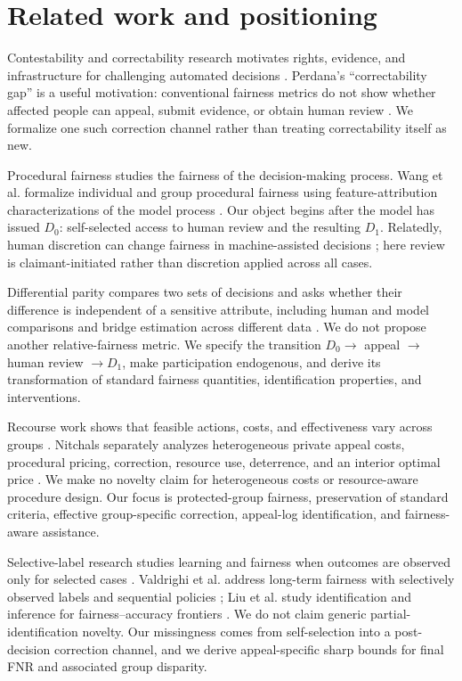 \documentclass[manuscript,screen,review]{jair}
\begin{document}
\section{Related work and positioning}

Contestability and correctability research motivates rights, evidence, and
infrastructure for challenging automated decisions
\citep{kaminski2021,cobbe2021,lyons2021,lyons2022,freiesleben2026}.  Perdana's
``correctability gap'' is a useful motivation: conventional fairness metrics
do not show whether affected people can appeal, submit evidence, or obtain
human review \citep{perdana2026legitimacy}.  We formalize one such correction
channel rather than treating correctability itself as new.

Procedural fairness studies the fairness of the decision-making process.
Wang et al. formalize individual and group procedural fairness using
feature-attribution characterizations of the model process
\citep{wang2026procedural}.  Our object begins after the model has issued
$D_0$: self-selected access to human review and the resulting $D_1$.
Relatedly, human discretion can change fairness in machine-assisted decisions
\citep{gillis2022,angelova2023}; here review is claimant-initiated rather than
discretion applied across all cases.

Differential parity compares two sets of decisions and asks whether their
difference is independent of a sensitive attribute, including human and model
comparisons and bridge estimation across different data
\citep{yu2026differential}.  We do not propose another relative-fairness
metric.  We specify the transition $D_0\to$ appeal $\to$ human review
$\to D_1$, make participation endogenous, and derive its transformation of
standard fairness quantities, identification properties, and interventions.

Recourse work shows that feasible actions, costs, and effectiveness vary
across groups \citep{vonkugelgen2020,kavouras2023}.  Nitchals separately
analyzes heterogeneous private appeal costs, procedural pricing, correction,
resource use, deterrence, and an interior optimal price
\citep{nitchals2026pricing}.  We make no novelty claim for heterogeneous costs
or resource-aware procedure design.  Our focus is protected-group fairness,
preservation of standard criteria, effective group-specific correction,
appeal-log identification, and fairness-aware assistance.

Selective-label research studies learning and fairness when outcomes are
observed only for selected cases
\citep{dearteaga2018,kilbertus2020,wei2021,coston2021,chen2025}.  Valdrighi et
al. address long-term fairness with selectively observed labels and sequential
policies \citep{valdrighi2026longterm}; Liu et al. study identification and
inference for fairness--accuracy frontiers \citep{liu2026frontiers}.  We do not
claim generic partial-identification novelty.  Our missingness comes from
self-selection into a post-decision correction channel, and we derive
appeal-specific sharp bounds for final FNR and associated group disparity.
\end{document}

